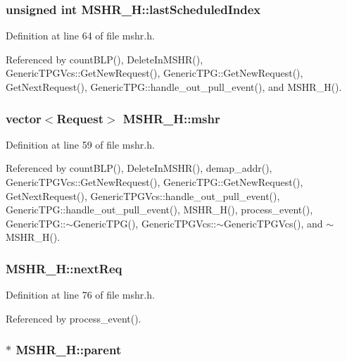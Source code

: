 \subsubsection[{lastScheduledIndex}]{\setlength{\rightskip}{0pt plus 5cm}unsigned int {\bf MSHR\_\-H::lastScheduledIndex}}\label{classMSHR__H_fd269df00bf476b2b151516b64cf7388}




Definition at line 64 of file mshr.h.

Referenced by countBLP(), DeleteInMSHR(), GenericTPGVcs::GetNewRequest(), GenericTPG::GetNewRequest(), GetNextRequest(), GenericTPG::handle\_\-out\_\-pull\_\-event(), and MSHR\_\-H().
\subsubsection[{mshr}]{\setlength{\rightskip}{0pt plus 5cm}vector$<${\bf Request}$>$ {\bf MSHR\_\-H::mshr}}\label{classMSHR__H_993765f65d7a1b94d3340bc166aab1f4}




Definition at line 59 of file mshr.h.

Referenced by countBLP(), DeleteInMSHR(), demap\_\-addr(), GenericTPGVcs::GetNewRequest(), GenericTPG::GetNewRequest(), GetNextRequest(), GenericTPGVcs::handle\_\-out\_\-pull\_\-event(), GenericTPG::handle\_\-out\_\-pull\_\-event(), MSHR\_\-H(), process\_\-event(), GenericTPG::$\sim$GenericTPG(), GenericTPGVcs::$\sim$GenericTPGVcs(), and $\sim$MSHR\_\-H().
\subsubsection[{nextReq}]{ {\bf MSHR\_\-H::nextReq}}\label{classMSHR__H_e27c92520271fd9c341f705c1d8d6a50}




Definition at line 76 of file mshr.h.

Referenced by process\_\-event().
\subsubsection[{parent}]{$\ast$ {\bf MSHR\_\-H::parent}}\label{classMSHR__H_d230dd4ae492389c1b03255bb76261fa}




